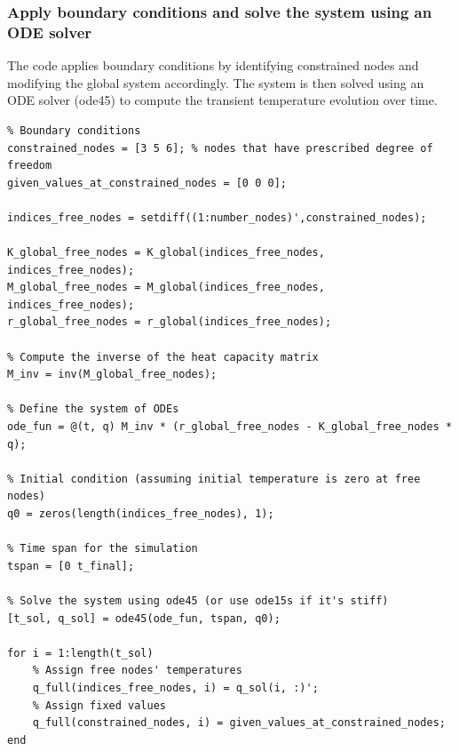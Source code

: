 \documentclass[12pt]{article}
\begin{document}
\subsubsection*{Apply boundary conditions and solve the system using an ODE solver}
The code applies boundary conditions by identifying constrained nodes and modifying the global system accordingly. The system is then solved using an ODE solver (ode45) to compute the transient temperature evolution over time.
\begin{verbatim}    
% Boundary conditions
constrained_nodes = [3 5 6]; % nodes that have prescribed degree of freedom
given_values_at_constrained_nodes = [0 0 0]; 
    
indices_free_nodes = setdiff((1:number_nodes)',constrained_nodes);

K_global_free_nodes = K_global(indices_free_nodes, indices_free_nodes);
M_global_free_nodes = M_global(indices_free_nodes, indices_free_nodes);
r_global_free_nodes = r_global(indices_free_nodes);
    
% Compute the inverse of the heat capacity matrix
M_inv = inv(M_global_free_nodes);
    
% Define the system of ODEs
ode_fun = @(t, q) M_inv * (r_global_free_nodes - K_global_free_nodes * q);
    
% Initial condition (assuming initial temperature is zero at free nodes)
q0 = zeros(length(indices_free_nodes), 1);
    
% Time span for the simulation
tspan = [0 t_final];
    
% Solve the system using ode45 (or use ode15s if it's stiff)
[t_sol, q_sol] = ode45(ode_fun, tspan, q0);
    
for i = 1:length(t_sol)
    % Assign free nodes' temperatures
    q_full(indices_free_nodes, i) = q_sol(i, :)'; 
    % Assign fixed values
    q_full(constrained_nodes, i) = given_values_at_constrained_nodes; 
end
\end{verbatim}
\end{document}
